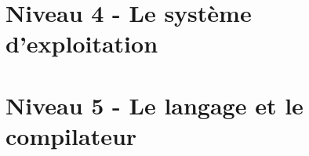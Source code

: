 \section{Niveau 4 - Le système d'exploitation}







\section{Niveau 5 - Le langage et le compilateur}





















